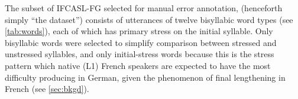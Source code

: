 \documentclass[a4paper]{article}
\begin{document}
	The subset of IFCASL-FG selected for manual error annotation, (henceforth simply “the dataset”) consists of utterances of twelve bisyllabic word types (see \cref{tab:words}), each of which has primary stress on the initial syllable. 
	Only bisyllabic words were selected to simplify comparison between stressed and unstressed syllables, and only initial-stress words because this is the stress pattern which native (L1) French speakers are expected to have the most difficulty producing in German, given the phenomenon of final lengthening in French (see \cref{sec:bkgd}).
	
\end{document}

